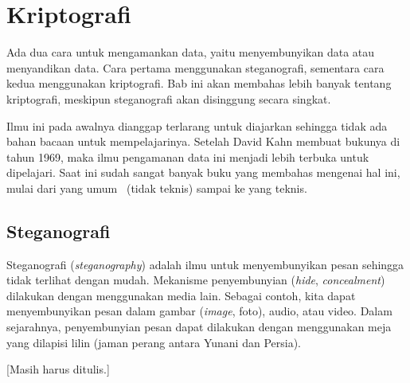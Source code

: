 \chapter{Kriptografi}
Ada dua cara untuk mengamankan data, yaitu menyembunyikan data atau menyandikan
data. Cara pertama menggunakan steganografi, sementara cara kedua menggunakan
kriptografi. Bab ini akan membahas lebih banyak tentang kriptografi, meskipun
steganografi akan disinggung secara singkat.

Ilmu ini pada awalnya dianggap terlarang untuk diajarkan sehingga tidak ada
bahan bacaan untuk mempelajarinya. Setelah David Kahn membuat bukunya di tahun
1969, maka ilmu pengamanan data ini menjadi lebih terbuka untuk dipelajari.
Saat ini sudah sangat banyak buku yang membahas mengenai hal ini, mulai dari
yang umum~\cite{levycrypto} (tidak teknis) sampai ke yang teknis.


\section{Steganografi}
Steganografi ({\em steganography}) adalah ilmu untuk menyembunyikan pesan
sehingga tidak terlihat dengan mudah. Mekanisme penyembunyian ({\em hide}, {\em
concealment}) dilakukan dengan menggunakan media lain. Sebagai contoh, kita
dapat menyembunyikan pesan dalam gambar ({\em image}, foto), audio, atau video.
Dalam sejarahnya, penyembunyian pesan dapat dilakukan dengan menggunakan meja
yang dilapisi lilin (jaman perang antara Yunani dan Persia).

[Masih harus ditulis.]
